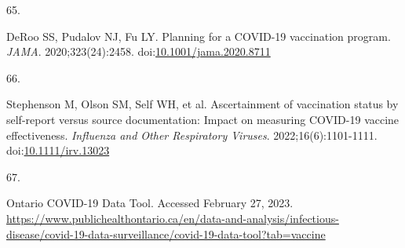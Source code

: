 \documentclass[
  letterpaper,
  DIV=11,
  numbers=noendperiod]{scrartcl}
\newlength{\cslhangindent}
\newlength{\csllabelwidth}
\newlength{\cslentryspacingunit} %
\newenvironment{CSLReferences}[2] %
 {%
  \setlength{\parindent}{0pt}
  \ifodd #1
  \let\oldpar\par
  \def\par{\hangindent=\cslhangindent\oldpar}
  \fi
  \setlength{\parskip}{#2\cslentryspacingunit}
 }%
 {}
\newcommand{\CSLLeftMargin}[1]{\parbox[t]{\csllabelwidth}{#1}}
\newcommand{\CSLRightInline}[1]{\parbox[t]{\linewidth - \csllabelwidth}{#1}\break}
\begin{document}
\begin{CSLReferences}{0}{0}
\leavevmode{}%
\CSLLeftMargin{65. }%
\CSLRightInline{DeRoo SS, Pudalov NJ, Fu LY. Planning for a {COVID}-19
vaccination program. \emph{{JAMA}}. 2020;323(24):2458.
doi:\href{https://doi.org/10.1001/jama.2020.8711}{10.1001/jama.2020.8711}}

\leavevmode{}%
\CSLLeftMargin{66. }%
\CSLRightInline{Stephenson M, Olson SM, Self WH, et al. Ascertainment of
vaccination status by self-report versus source documentation: Impact on
measuring {COVID}-19 vaccine effectiveness. \emph{Influenza and Other
Respiratory Viruses}. 2022;16(6):1101-1111.
doi:\href{https://doi.org/10.1111/irv.13023}{10.1111/irv.13023}}

\leavevmode{}%
\CSLLeftMargin{67. }%
\CSLRightInline{{Ontario COVID-19 Data Tool}. Accessed February 27,
2023.
\url{https://www.publichealthontario.ca/en/data-and-analysis/infectious-disease/covid-19-data-surveillance/covid-19-data-tool?tab=vaccine}}

\end{CSLReferences}
\end{document}
